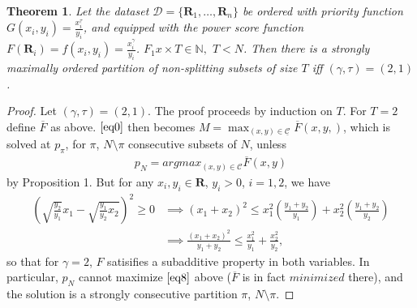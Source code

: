 \documentclass{article}
\newtheorem{thm}{Theorem}
\theoremstyle{case}
\begin{document}
\begin{thm} \label{thm0}
Let the dataset $\mathcal{D} = \{ \mathbf{R}_1, \ldots, \mathbf{R}_n \}$ be ordered with priority function $G(x_i,y_i) =  \frac{x_i^\tau}{y_i}$, and equipped with the power score function $F(\mathbf{R}_i) = f(x_i,y_i) = \frac{x_i^\gamma}{y_i}$. $F_1x \times T \in \mathbb{N},$ $T < N$. Then there is a strongly maximally ordered partition of non-splitting subsets of size $T$ iff $(\gamma, \tau) = (2,1)$.
\end{thm}
\begin{proof}
Let $\left( \gamma, \tau\right) = \left( 2,1\right)$. The proof proceeds by induction on $T$. For $T=2$ define $\overline{F}$ as above. $\ref{eq0}$ then becomes $M = \max_{\left( x,y\right) \in \underline{\mathcal{C}}} \overline{F}\left( x,y,\right)$, which is solved at $p_{\pi}$, for $\pi$, $N\setminus \pi$ consecutive subsets of $N$, unless 
\begin{align} \label{eq8}
p_N = argmax_{\left( x,y\right) \in \mathcal{C}} \overline{F}\left( x,y\right)
\end{align} by Proposition 1. But for any $x_i, y_i \in \mathbf{R}$, $y_i > 0$, $i = 1,2$, we have
\begin{align*}
\left( \sqrt{\frac{y_2}{y_1}}x_1 - \sqrt{\frac{y_1}{y_2}x_2}\right)^2 \geq 0 &\implies \left( x_1+x_2\right)^2 \leq x_1^2\left( \frac{y_1+y_2}{y_1}\right) + x_2^2\left( \frac{y_1+y_2}{y_2}\right)\\
&\implies \frac{\left( x_1+x_2\right)^2}{y_1+y_2} \leq \frac{x_1^2}{y_1} + \frac{x_2^2}{y_2},
\end{align*}
so that for $\gamma = 2$, $F$ satisifies a subadditive property in both variables. In particular, $p_N$ cannot maximize $\ref{eq8}$ above ($\overline{F}$ is in fact $\textit{minimized}$ there), and the solution is a strongly consecutive partition $\pi$, $N\setminus \pi$. 


\end{proof}
\end{document}
